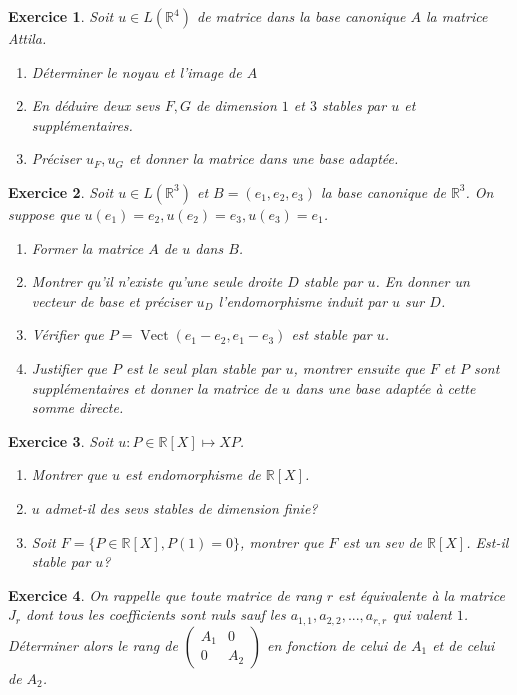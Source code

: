 \documentclass[12pt,a4paper]{article}
\newcommand{\R}{\mathbb{R}}
\DeclareMathOperator{\vect}{Vect}
\theoremstyle{break}
\theoremstyle{break}
\newtheorem{Exo}{Exercice}
\begin{document}
\begin{Exo}
	Soit $u\in L(\R^4)$ de matrice dans la base canonique $A$ la matrice Attila.
	\begin{enumerate}
		\item
		Déterminer le noyau et l'image de $A$
		\item
		En déduire deux sevs $F,G$ de dimension $1$ et $3$ stables par $u$ et supplémentaires.
		\item
		Préciser $u_F,u_G$ et donner la matrice dans une base adaptée.
	\end{enumerate}
\end{Exo}
\newpage
\begin{Exo}
	Soit $u\in L(\R^3)$ et $B=(e_1,e_2,e_3)$ la base canonique de $\R^3$. On suppose que $u(e_1)=e_2,u(e_2)=e_3,u(e_3)=e_1$.
	\begin{enumerate}
		\item
		Former la matrice $A$ de $u$ dans $B$.
		\item
		Montrer qu'il n'existe qu'une seule droite $D$ stable par $u$. En donner un vecteur de base et préciser $u_D$ l'endomorphisme induit par $u$ sur $D$.
		\item
		Vérifier que $P=\vect(e_1-e_2,e_1-e_3)$ est stable par $u$.
		\item Justifier que $P$ est le seul plan stable par $u$, montrer ensuite que $F$ et $P$ sont supplémentaires et donner la matrice de $u$ dans une base adaptée à cette somme directe.
	\end{enumerate}
\end{Exo}

\begin{Exo}
	Soit $u:P\in \R[X]\mapsto XP$.
	\begin{enumerate}
		\item
		Montrer que $u$ est endomorphisme de $\R[X]$.
		\item
		$u$ admet-il des sevs stables de dimension finie?
		\item
		Soit $F=\{P\in\R[X],P(1)=0\}$, montrer que $F$ est un sev de $\R[X]$. Est-il stable par $u$?
	\end{enumerate}
\end{Exo}

\begin{Exo}
	On rappelle que toute matrice de rang $r$ est équivalente à la matrice $J_r$ dont tous les coefficients sont nuls sauf les $a_{1,1},a_{2,2},...,a_{r,r}$ qui valent $1$. Déterminer alors le rang de $\begin{pmatrix}
		A_1 & 0 \\
		0 & A_2
	\end{pmatrix}$ en fonction de celui de $A_1$ et de celui de $A_2$.
	
\end{Exo}
\end{document}
